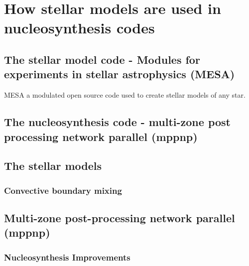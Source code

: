 \chapter{How stellar models are used in nucleosynthesis codes}

\section{The stellar model code - Modules for experiments in stellar astrophysics (MESA)}

MESA a modulated open source code used to create stellar models of any star.

\section{The nucleosynthesis code - multi-zone post processing network parallel (mppnp)}

\section{The stellar models}

\subsection{Convective boundary mixing}

\section{Multi-zone post-processing network parallel (mppnp)}

\subsection{Nucleosynthesis Improvements}
